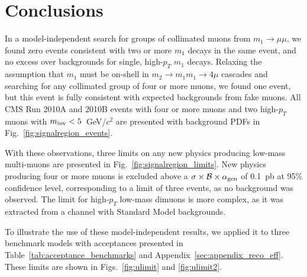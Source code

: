 \section{Conclusions}

In a model-independent search for groups of collimated muons from $m_1
\to \mu\mu$, we found zero events consistent with two or more $m_1$
decays in the same event, and no excess over backgrounds for single,
high-$p_T$ $m_1$ decays.  Relaxing the assumption that $m_1$ must be
on-shell in $m_2 \to m_1 m_1 \to 4\mu$ cascades and searching for any
collimated group of four or more muons, we found one event, but this
event is fully consistent with expected backgrounds from fake muons.
All CMS Run 2010A and 2010B events with four or more muons and two
high-$p_T$ muons with $m_{\mbox{\scriptsize inv}} < 5$~GeV/$c^2$ are
presented with background PDFs in Fig.~\ref{fig:signalregion_events}.

With these observations, three limits on any new physics producing
low-mass multi-muons are presented in
Fig.~\ref{fig:signalregion_limits}.  New physics producing four or
more muons is excluded above a $\sigma \times \mathcal{B} \times
\alpha_{\mbox{\scriptsize gen}}$ of 0.1~pb at 95\% confidence level,
corresponding to a limit of three events, as no background was
observed.  The limit for high-$p_T$ low-mass dimuons is more complex,
as it was extracted from a channel with Standard Model backgrounds.

To illustrate the use of these model-independent results, we applied
it to three benchmark models with acceptances presented in
Table~\ref{tab:acceptance_benchmarks} and
Appendix~\ref{sec:appendix_reco_eff}.  These limits are shown in
Figs.~\ref{fig:ulimit} and \ref{fig:ulimit2}.
